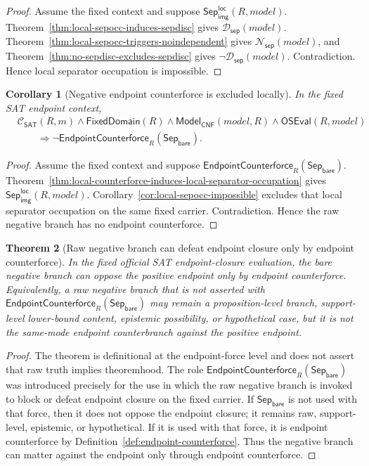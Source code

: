 \documentclass[11pt]{article}
\newtheorem{theorem}{Theorem}[section]
\newtheorem{corollary}[theorem]{Corollary}
\theoremstyle{definition}
\theoremstyle{remark}
\newcommand{\SepBare}{\mathsf{Sep}_{\mathsf{bare}}}
\newcommand{\LocalSepImgOcc}{\mathsf{Sep}_{\mathsf{img}}^{\mathsf{loc}}}
\newcommand{\ClayCtx}{\mathcal{C}_{\mathsf{SAT}}(R,m)}
\newcommand{\FixedDom}{\mathsf{FixedDomain}}
\newcommand{\SepDisc}{\mathcal{D}_{\mathsf{sep}}}
\newcommand{\NoSepDisc}{\mathcal{N}_{\mathsf{sep}}}
\newcommand{\ModelOfCnf}{\mathsf{Model}_{\mathsf{CNF}}}
\newcommand{\OfficialSATEval}{\mathsf{OSEval}}
\newcommand{\EndpointCounterforce}{\mathsf{EndpointCounterforce}}
\begin{document}
\begin{proof}
Assume the fixed context and suppose \(\LocalSepImgOcc(R,model)\). Theorem~\ref{thm:local-sepocc-induces-sepdisc} gives \(\SepDisc(model)\). Theorem~\ref{thm:local-sepocc-triggers-noindependent} gives \(\NoSepDisc(model)\), and Theorem~\ref{thm:no-sepdisc-excludes-sepdisc} gives \(\neg\SepDisc(model)\). Contradiction. Hence local separator occupation is impossible.
\end{proof}

\begin{corollary}[Negative endpoint counterforce is excluded locally]
\label{cor:negative-endpoint-counterforce-excluded}
In the fixed SAT endpoint context,
\[
\begin{aligned}
  &\ClayCtx\wedge\FixedDom(R)\wedge\ModelOfCnf(model,R)\wedge\OfficialSATEval(R,model)\\
  &\qquad\Rightarrow \neg\EndpointCounterforce_R(\SepBare).
\end{aligned}
\]
\end{corollary}

\begin{proof}
Assume the fixed context and suppose \(\EndpointCounterforce_R(\SepBare)\). Theorem~\ref{thm:local-counterforce-induces-local-separator-occupation} gives \(\LocalSepImgOcc(R,model)\). Corollary~\ref{cor:local-sepocc-impossible} excludes that local separator occupation on the same fixed carrier. Contradiction. Hence the raw negative branch has no endpoint counterforce.
\end{proof}

\begin{theorem}[Raw negative branch can defeat endpoint closure only by endpoint counterforce]
\label{thm:raw-negative-defeats-only-by-counterforce}
In the fixed official SAT endpoint-closure evaluation, the bare negative branch can oppose the positive endpoint only by endpoint counterforce. Equivalently, a raw negative branch that is not asserted with \(\EndpointCounterforce_R(\SepBare)\) may remain a proposition-level branch, support-level lower-bound content, epistemic possibility, or hypothetical case, but it is not the same-mode endpoint counterbranch against the positive endpoint.
\end{theorem}

\begin{proof}
The theorem is definitional at the endpoint-force level and does not assert that raw truth implies theoremhood. The role \(\EndpointCounterforce_R(\SepBare)\) was introduced precisely for the use in which the raw negative branch is invoked to block or defeat endpoint closure on the fixed carrier. If \(\SepBare\) is not used with that force, then it does not oppose the endpoint closure; it remains raw, support-level, epistemic, or hypothetical. If it is used with that force, it is endpoint counterforce by Definition~\ref{def:endpoint-counterforce}. Thus the negative branch can matter against the endpoint only through endpoint counterforce.
\end{proof}
\end{document}
